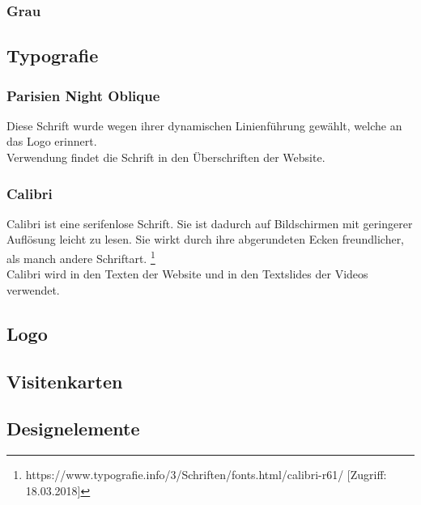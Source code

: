 \subsubsection{Grau}
\subsection{Typografie}
\subsubsection{Parisien Night Oblique}
\renewcommand{\kapitelautor}{Autor: Niklas Kienreich}
Diese Schrift wurde wegen ihrer dynamischen Linienführung gewählt, welche an das Logo erinnert.
\\
Verwendung findet die Schrift in den Überschriften der Website.


\subsubsection{Calibri}
\renewcommand{\kapitelautor}{Autor: Niklas Kienreich}
Calibri ist eine serifenlose Schrift. Sie ist dadurch auf Bildschirmen mit geringerer Auflösung leicht zu lesen. Sie wirkt durch ihre abgerundeten Ecken freundlicher, als manch andere Schriftart. \footnote{\label{foot:2} https://www.typografie.info/3/Schriften/fonts.html/calibri-r61/ [Zugriff: 18.03.2018]}
\\
Calibri wird in den Texten der Website und in den Textslides der Videos verwendet.


\subsection{Logo}
\subsection{Visitenkarten}
\subsection{Designelemente}
